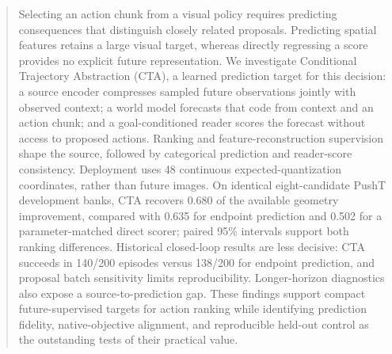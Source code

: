 \begin{abstract}
Selecting an action chunk from a visual policy requires predicting consequences that distinguish closely related proposals. Predicting spatial features retains a large visual target, whereas directly regressing a score provides no explicit future representation. We investigate Conditional Trajectory Abstraction (CTA), a learned prediction target for this decision: a source encoder compresses sampled future observations jointly with observed context; a world model forecasts that code from context and an action chunk; and a goal-conditioned reader scores the forecast without access to proposed actions. Ranking and feature-reconstruction supervision shape the source, followed by categorical prediction and reader-score consistency. Deployment uses 48 continuous expected-quantization coordinates, rather than future images. On identical eight-candidate PushT development banks, CTA recovers 0.680 of the available geometry improvement, compared with 0.635 for endpoint prediction and 0.502 for a parameter-matched direct scorer; paired 95\% intervals support both ranking differences. Historical closed-loop results are less decisive: CTA succeeds in 140/200 episodes versus 138/200 for endpoint prediction, and proposal batch sensitivity limits reproducibility. Longer-horizon diagnostics also expose a source-to-prediction gap. These findings support compact future-supervised targets for action ranking while identifying prediction fidelity, native-objective alignment, and reproducible held-out control as the outstanding tests of their practical value.
\end{abstract}
